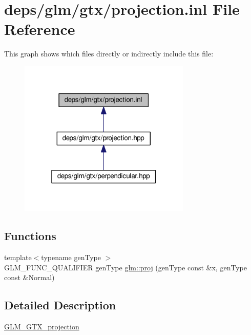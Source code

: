 \hypertarget{projection_8inl}{}\section{deps/glm/gtx/projection.inl File Reference}
\label{projection_8inl}
This graph shows which files directly or indirectly include this file\+:
\nopagebreak
\begin{figure}[H]
\begin{center}
\leavevmode
\includegraphics[width=232pt]{d7/d53/projection_8inl__dep__incl}
\end{center}
\end{figure}
\subsection*{Functions}
\begin{DoxyCompactItemize}
\item 
{\footnotesize template$<$typename gen\+Type $>$ }\\G\+L\+M\+\_\+\+F\+U\+N\+C\+\_\+\+Q\+U\+A\+L\+I\+F\+I\+ER gen\+Type \hyperlink{group__gtx__projection_ga58384b7170801dd513de46f87c7fb00e}{glm\+::proj} (gen\+Type const \&x, gen\+Type const \&Normal)
\end{DoxyCompactItemize}


\subsection{Detailed Description}
\hyperlink{group__gtx__projection}{G\+L\+M\+\_\+\+G\+T\+X\+\_\+projection} 